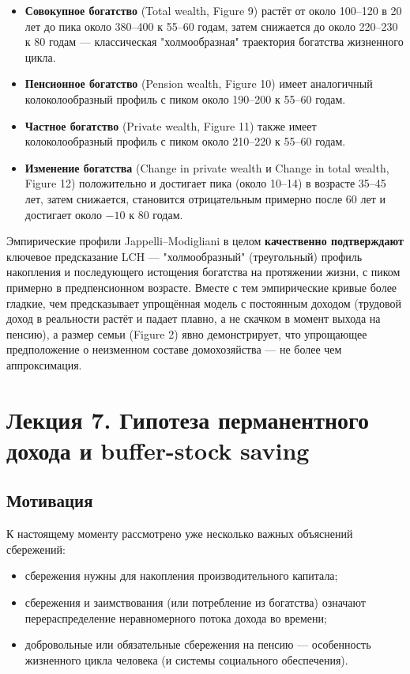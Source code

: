 \documentclass[10pt,a4paper]{article}
\begin{document}
\begin{itemize}[leftmargin=1.3em]
\item \textbf{Совокупное богатство} (Total wealth, Figure 9) растёт от около 100--120 в 20 лет до пика около 380--400 к 55--60 годам, затем снижается до около 220--230 к 80 годам — классическая "холмообразная" траектория богатства жизненного цикла.
\item \textbf{Пенсионное богатство} (Pension wealth, Figure 10) имеет аналогичный колоколообразный профиль с пиком около 190--200 к 55--60 годам.
\item \textbf{Частное богатство} (Private wealth, Figure 11) также имеет колоколообразный профиль с пиком около 210--220 к 55--60 годам.
\item \textbf{Изменение богатства} (Change in private wealth и Change in total wealth, Figure 12) положительно и достигает пика (около 10--14) в возрасте 35--45 лет, затем снижается, становится отрицательным примерно после 60 лет и достигает около $-10$ к 80 годам.
\end{itemize}

\begin{intuition}
Эмпирические профили Jappelli--Modigliani в целом \textbf{качественно подтверждают} ключевое предсказание LCH — "холмообразный" (треугольный) профиль накопления и последующего истощения богатства на протяжении жизни, с пиком примерно в предпенсионном возрасте. Вместе с тем эмпирические кривые более гладкие, чем предсказывает упрощённая модель с постоянным доходом (трудовой доход в реальности растёт и падает плавно, а не скачком в момент выхода на пенсию), а размер семьи (Figure 2) явно демонстрирует, что упрощающее предположение о неизменном составе домохозяйства — не более чем аппроксимация.
\end{intuition}

\newpage
\section{Лекция 7. Гипотеза перманентного дохода и buffer-stock saving}

\subsection{Мотивация}

К настоящему моменту рассмотрено уже несколько важных объяснений сбережений:
\begin{itemize}[leftmargin=1.3em]
\item сбережения нужны для накопления производительного капитала;
\item сбережения и заимствования (или потребление из богатства) означают перераспределение неравномерного потока дохода во времени;
\item добровольные или обязательные сбережения на пенсию — особенность жизненного цикла человека (и системы социального обеспечения).
\end{itemize}
\end{document}
